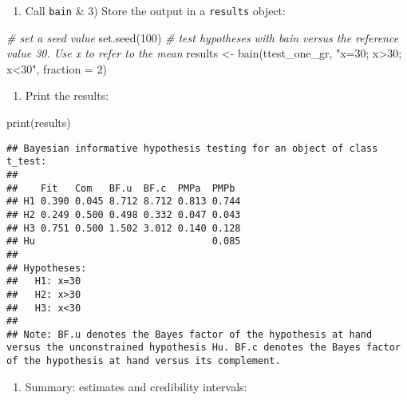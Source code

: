 \documentclass[
]{book}
\newenvironment{Shaded}{\begin{snugshade}}{\end{snugshade}}
\newcommand{\AttributeTok}[1]{\textcolor[rgb]{0.77,0.63,0.00}{#1}}
\newcommand{\CommentTok}[1]{\textcolor[rgb]{0.56,0.35,0.01}{\textit{#1}}}
\newcommand{\DecValTok}[1]{\textcolor[rgb]{0.00,0.00,0.81}{#1}}
\newcommand{\FunctionTok}[1]{\textcolor[rgb]{0.00,0.00,0.00}{#1}}
\newcommand{\NormalTok}[1]{#1}
\newcommand{\OtherTok}[1]{\textcolor[rgb]{0.56,0.35,0.01}{#1}}
\newcommand{\StringTok}[1]{\textcolor[rgb]{0.31,0.60,0.02}{#1}}
\providecommand{\tightlist}{%
  \setlength{\itemsep}{0pt}\setlength{\parskip}{0pt}}
\begin{document}
\begin{enumerate}
\def\labelenumi{\arabic{enumi})}
\setcounter{enumi}{1}
\tightlist
\item
  Call \texttt{bain} \& 3) Store the output in a \texttt{results} object:
\end{enumerate}

\begin{Shaded}
\begin{Highlighting}[]
\CommentTok{\# set a seed value}
\FunctionTok{set.seed}\NormalTok{(}\DecValTok{100}\NormalTok{)}
\CommentTok{\# test hypotheses with bain versus the reference value 30. Use x to refer to the mean}
\NormalTok{results }\OtherTok{\textless{}{-}} \FunctionTok{bain}\NormalTok{(ttest\_one\_gr, }\StringTok{"x=30; x\textgreater{}30; x\textless{}30"}\NormalTok{, }\AttributeTok{fraction =} \DecValTok{2}\NormalTok{)}
\end{Highlighting}
\end{Shaded}

\begin{enumerate}
\def\labelenumi{\arabic{enumi})}
\setcounter{enumi}{2}
\tightlist
\item
  Print the results:
\end{enumerate}

\begin{Shaded}
\begin{Highlighting}[]
\FunctionTok{print}\NormalTok{(results)}
\end{Highlighting}
\end{Shaded}

\begin{verbatim}
## Bayesian informative hypothesis testing for an object of class t_test:
## 
##    Fit   Com   BF.u  BF.c  PMPa  PMPb 
## H1 0.390 0.045 8.712 8.712 0.813 0.744
## H2 0.249 0.500 0.498 0.332 0.047 0.043
## H3 0.751 0.500 1.502 3.012 0.140 0.128
## Hu                               0.085
## 
## Hypotheses:
##   H1: x=30
##   H2: x>30
##   H3: x<30
## 
## Note: BF.u denotes the Bayes factor of the hypothesis at hand versus the unconstrained hypothesis Hu. BF.c denotes the Bayes factor of the hypothesis at hand versus its complement.
\end{verbatim}

\begin{enumerate}
\def\labelenumi{\arabic{enumi})}
\setcounter{enumi}{3}
\tightlist
\item
  Summary: estimates and credibility intervals:
\end{enumerate}
\end{document}
